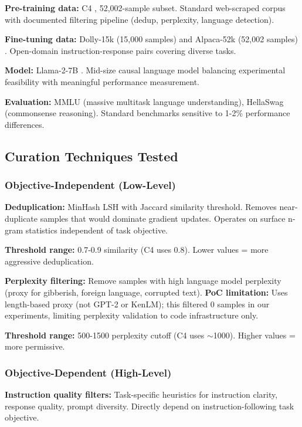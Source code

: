 \textbf{Pre-training data:} C4 \cite{raffel2020exploring}, 52,002-sample subset. Standard web-scraped corpus with documented filtering pipeline (dedup, perplexity, language detection).

\textbf{Fine-tuning data:} Dolly-15k (15,000 samples) \cite{conover2023free} and Alpaca-52k (52,002 samples) \cite{taori2023stanford}. Open-domain instruction-response pairs covering diverse tasks.

\textbf{Model:} Llama-2-7B \cite{touvron2023llama}. Mid-size causal language model balancing experimental feasibility with meaningful performance measurement.

\textbf{Evaluation:} MMLU \cite{hendrycks2021measuring} (massive multitask language understanding), HellaSwag \cite{zellers2019hellaswag} (commonsense reasoning). Standard benchmarks sensitive to 1-2\% performance differences.

\subsection{Curation Techniques Tested}

\subsubsection{Objective-Independent (Low-Level)}

\textbf{Deduplication:} MinHash LSH with Jaccard similarity threshold. Removes near-duplicate samples that would dominate gradient updates. Operates on surface n-gram statistics independent of task objective.

\textbf{Threshold range:} 0.7-0.9 similarity (C4 uses 0.8). Lower values = more aggressive deduplication.

\textbf{Perplexity filtering:} Remove samples with high language model perplexity (proxy for gibberish, foreign language, corrupted text). \textbf{PoC limitation:} Uses length-based proxy (not GPT-2 or KenLM); this filtered 0 samples in our experiments, limiting perplexity validation to code infrastructure only.

\textbf{Threshold range:} 500-1500 perplexity cutoff (C4 uses $\sim$1000). Higher values = more permissive.

\subsubsection{Objective-Dependent (High-Level)}

\textbf{Instruction quality filters:} Task-specific heuristics for instruction clarity, response quality, prompt diversity. Directly depend on instruction-following task objective.

